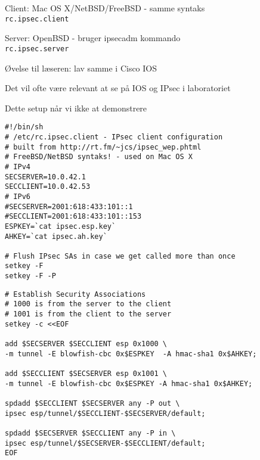 \documentclass[Screen16to9,17pt,footrule]{foils}
\begin{document}


\begin{list1}
  \item Client: Mac OS X/NetBSD/FreeBSD - samme syntaks\\
\verb+rc.ipsec.client+

\item Server: OpenBSD - bruger ipsecadm kommando\\
\verb+rc.ipsec.server+

\item Øvelse til læseren: lav samme i Cisco IOS
\item Det vil ofte være relevant at se på IOS og IPsec i laboratoriet
\item Dette setup når vi ikke at demonstrere
\end{list1}


\begin{verbatim}
#!/bin/sh
# /etc/rc.ipsec.client - IPsec client configuration
# built from http://rt.fm/~jcs/ipsec_wep.phtml
# FreeBSD/NetBSD syntaks! - used on Mac OS X
# IPv4
SECSERVER=10.0.42.1
SECCLIENT=10.0.42.53
# IPv6
#SECSERVER=2001:618:433:101::1
#SECCLIENT=2001:618:433:101::153
ESPKEY=`cat ipsec.esp.key`
AHKEY=`cat ipsec.ah.key`

# Flush IPsec SAs in case we get called more than once
setkey -F
setkey -F -P
\end{verbatim}


\begin{verbatim}
# Establish Security Associations
# 1000 is from the server to the client
# 1001 is from the client to the server
setkey -c <<EOF

add $SECSERVER $SECCLIENT esp 0x1000 \
-m tunnel -E blowfish-cbc 0x$ESPKEY  -A hmac-sha1 0x$AHKEY;

add $SECCLIENT $SECSERVER esp 0x1001 \
-m tunnel -E blowfish-cbc 0x$ESPKEY -A hmac-sha1 0x$AHKEY;

spdadd $SECCLIENT $SECSERVER any -P out \
ipsec esp/tunnel/$SECCLIENT-$SECSERVER/default;

spdadd $SECSERVER $SECCLIENT any -P in \
ipsec esp/tunnel/$SECSERVER-$SECCLIENT/default;
EOF
\end{verbatim}

\end{document}
